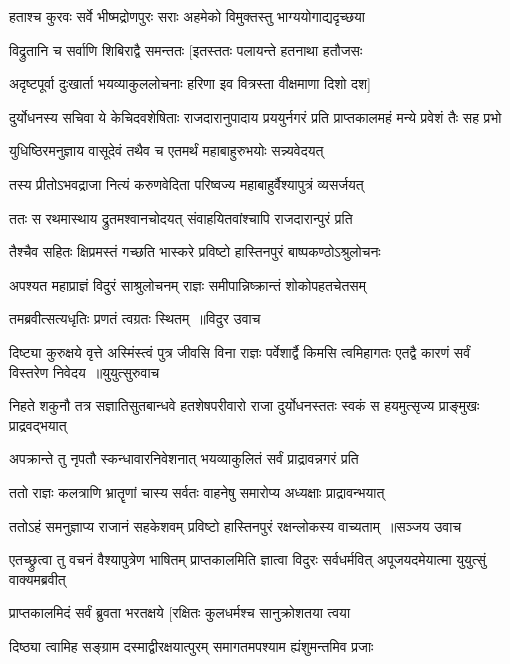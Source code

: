 \twolineshloka
{हताश्च कुरवः सर्वे भीष्मद्रोणपुरः सराः}
{अहमेको विमुक्तस्तु भाग्ययोगाद्यदृच्छया}


\twolineshloka
{विद्रुतानि च सर्वाणि शिबिराद्वै समन्ततः}
{[इतस्ततः पलायन्ते हतनाथा हतौजसः}


\twolineshloka
{अदृष्टपूर्वा दुःखार्ता भयव्याकुललोचनाः}
{हरिणा इव वित्रस्ता वीक्षमाणा दिशो दश]}


\threelineshloka
{दुर्योधनस्य सचिवा ये केचिदवशेषिताः}
{राजदारानुपादाय प्रययुर्नगरं प्रति}
{प्राप्तकालमहं मन्ये प्रवेशं तैः सह प्रभो}


\twolineshloka
{युधिष्ठिरमनुज्ञाय वासूदेवं तथैव च}
{एतमर्थं महाबाहुरुभयोः सन्न्यवेदयत्}


\twolineshloka
{तस्य प्रीतोऽभवद्राजा नित्यं करुणवेदिता}
{परिष्वज्य महाबाहुर्वैश्यापुत्रं व्यसर्जयत्}


\twolineshloka
{ततः स रथमास्थाय द्रुतमश्वानचोदयत्}
{संवाहयितवांश्चापि राजदारान्पुरं प्रति}


\twolineshloka
{तैश्चैव सहितः क्षिप्रमस्तं गच्छति भास्करे}
{प्रविष्टो हास्तिनपुरं बाष्पकण्ठोऽश्रुलोचनः}


\twolineshloka
{अपश्यत महाप्राज्ञं विदुरं साश्रुलोचनम्}
{राज्ञः समीपान्निष्क्रान्तं शोकोपहतचेतसम्}


\twolineshloka
{तमब्रवीत्सत्यधृतिः प्रणतं त्वग्रतः स्थितम् ॥विदुर उवाच}
{}


\fourlineindentedshloka
{दिष्ट्या कुरुक्षये वृत्ते अस्मिंस्त्वं पुत्र जीवसि}
{विना राज्ञः पर्वेशार्द्वै किमसि त्वमिहागतः}
{एतद्वै कारणं सर्वं विस्तरेण निवेदय ॥युयुत्सुरुवाच}
{}


\threelineshloka
{निहते शकुनौ तत्र सज्ञातिसुतबान्धवे}
{हतशेषपरीवारो राजा दुर्योधनस्ततः}
{स्वकं स हयमुत्सृज्य प्राङ्मुखः प्राद्रवद्भयात्}


\twolineshloka
{अपक्रान्ते तु नृपतौ स्कन्धावारनिवेशनात्}
{भयव्याकुलितं सर्वं प्राद्रावन्नगरं प्रति}


\twolineshloka
{ततो राज्ञः कलत्राणि भ्रातॄणां चास्य सर्वतः}
{वाहनेषु समारोप्य अध्यक्षाः प्राद्रावन्भयात्}


\threelineshloka
{ततोऽहं समनुज्ञाप्य राजानं सहकेशवम्}
{प्रविष्टो हास्तिनपुरं रक्षन्लोकस्य वाच्यताम् ॥सञ्जय उवाच}
{}


\threelineshloka
{एतच्छ्रुत्वा तु वचनं वैश्यापुत्रेण भाषितम्}
{प्राप्तकालमिति ज्ञात्वा विदुरः सर्वधर्मवित्}
{अपूजयदमेयात्मा युयुत्सुं वाक्यमब्रवीत्}


\twolineshloka
{प्राप्तकालमिदं सर्वं ब्रुवता भरतक्षये}
{[रक्षितः कुलधर्मश्च सानुक्रोशतया त्वया}


\twolineshloka
{दिष्ठ्या त्वामिह सङ्ग्राम दस्माद्वीरक्षयात्पुरम्}
{समागतमपश्याम ह्यंशुमन्तमिव प्रजाः}


